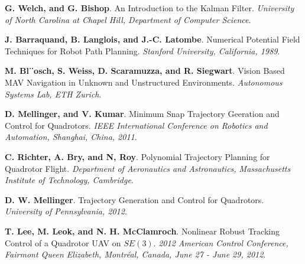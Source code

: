 \documentclass[11pt, a4paper, onecolumn, fleqn, twoside, titlepage, openright]{book}
\begin{document}
\begin{thebibliography}{1}
		\textbf{G. Welch, and G. Bishop}.
		An Introduction to the Kalman Filter.
		\textit{University of North Carolina at Chapel Hill, Department of Computer Science}.

		\textbf{J. Barraquand, B. Langlois, and J.-C. Latombe}.
		Numerical Potential Field Techniques for Robot Path Planning.
		\textit{Stanford University, California, 1989}.

		\textbf{M. Bl¨osch, S. Weiss, D. Scaramuzza, and R. Siegwart}.
		Vision Based MAV Navigation in Unknown and Unstructured Environments.
		\textit{Autonomous Systems Lab, ETH Zurich}.

		\textbf{D. Mellinger, and V. Kumar}.
		Minimum Snap Trajectory Geeration and Control for Quadrotors.
		\textit{IEEE International Conference on Robotics and Automation, Shanghai, China, 2011}.

		\textbf{C. Richter, A. Bry, and N, Roy}.
		Polynomial Trajectory Planning for Quadrotor Flight.
		\textit{Department of Aeronautics and Astronautics, Massachusetts Institute of Technology, Cambridge}.

		\textbf{D. W. Mellinger}.
		Trajectory Generation and Control for Quadrotors.
		\textit{University of Pennsylvania, 2012}.

		\textbf{T. Lee, M. Leok, and N. H. McClamroch}.
		Nonlinear Robust Tracking Control of a Quadrotor UAV on $SE(3)$.
		\textit{2012 American Control Conference, Fairmont Queen Elizabeth, Montréal, Canada, June 27 - June 29, 2012}.		

	\end{thebibliography}
\end{document}
